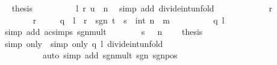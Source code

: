 \begin{isabellebody}
\ \isamarkupfalse%
\ {\isacharquery}{\kern0pt}thesis\isanewline
\ \ \ \ \ \ \ \ \isamarkupfalse%
\ l\ r\ {\isacartoucheopen}u\ {\isacharless}{\kern0pt}\ n{\isacartoucheclose}\ \isamarkupfalse%
\ {\isacharparenleft}{\kern0pt}simp\ add{\isacharcolon}{\kern0pt}\ divide{\isacharunderscore}{\kern0pt}int{\isacharunderscore}{\kern0pt}unfold{\isacharparenright}{\kern0pt}\isanewline
\ \ \ \ \isamarkupfalse%
\isanewline
\ \ \ \ \ \ \isamarkupfalse%
\ {\isachardoublequoteopen}r\ {\isacharequal}{\kern0pt}\ {}{\isachardoublequoteclose}\isanewline
\ \ \ \ \ \ \isamarkupfalse%
\ {\isacartoucheopen}r\ {\isacharequal}{\kern0pt}\ {}{\isacartoucheclose}\ \isamarkupfalse%
\ {\isacharasterisk}{\kern0pt}{\isacharcolon}{\kern0pt}\ {\isachardoublequoteopen}q\ {\isacharasterisk}{\kern0pt}\ l\ {\isacharplus}{\kern0pt}\ r\ {\isacharequal}{\kern0pt}\ sgn\ {\isacharparenleft}{\kern0pt}t\ {\isacharasterisk}{\kern0pt}\ s{\isacharparenright}{\kern0pt}\ {\isacharasterisk}{\kern0pt}\ int\ {\isacharparenleft}{\kern0pt}n\ {\isacharasterisk}{\kern0pt}\ m{\isacharparenright}{\kern0pt}{\isachardoublequoteclose}\isanewline
\ \ \ \ \ \ \ \ \isamarkupfalse%
\ q\ l\ \isamarkupfalse%
\ {\isacharparenleft}{\kern0pt}simp\ add{\isacharcolon}{\kern0pt}\ ac{\isacharunderscore}{\kern0pt}simps\ sgn{\isacharunderscore}{\kern0pt}mult{\isacharparenright}{\kern0pt}\isanewline
\ \ \ \ \ \ \isamarkupfalse%
\ {\isacartoucheopen}s\ {\isasymnoteq}\ {}{\isacartoucheclose}\ {\isacartoucheopen}n\ {\isachargreater}{\kern0pt}\ {}{\isacartoucheclose}\ \isamarkupfalse%
\ {\isacharquery}{\kern0pt}thesis\isanewline
\ \ \ \ \ \ \ \ \isamarkupfalse%
\ {\isacharparenleft}{\kern0pt}simp\ only{\isacharcolon}{\kern0pt}\ {\isacharasterisk}{\kern0pt}{\isacharcomma}{\kern0pt}\ simp\ only{\isacharcolon}{\kern0pt}\ q\ l\ divide{\isacharunderscore}{\kern0pt}int{\isacharunderscore}{\kern0pt}unfold{\isacharparenright}{\kern0pt}\isanewline
\ \ \ \ \ \ \ \ \ \ {\isacharparenleft}{\kern0pt}auto\ simp\ add{\isacharcolon}{\kern0pt}\ sgn{\isacharunderscore}{\kern0pt}mult\ sgn{\isacharunderscore}{\kern0pt}{}{\isacharunderscore}{\kern0pt}{}\ sgn{\isacharunderscore}{\kern0pt}{}{\isacharunderscore}{\kern0pt}pos{\isacharparenright}{\kern0pt}\isanewline
\ \ \ \ \isamarkupfalse%
\isanewline
\ \ \isamarkupfalse%
\isanewline
\ \ \ \ \isamarkupfalse%

\end{isabellebody}
